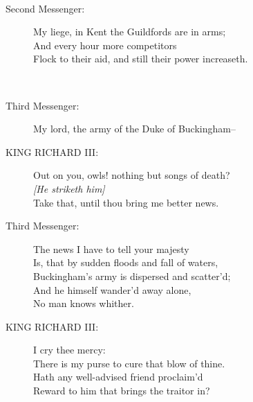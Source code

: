 \documentclass{article}
\begin{document}
\\
\begin{description}
\item[Second Messenger:] 
\hspace{1pt}My liege, in Kent the Guildfords are in arms;\\
\hspace{1pt}And every hour more competitors\\
\hspace{1pt}Flock to their aid, and still their power increaseth.\\
\end{description}
\\
\begin{description}
\item[Third Messenger:] 
\hspace{1pt}My lord, the army of the Duke of Buckingham--\\
\end{description}
\begin{description}
\item[KING RICHARD III:] 
\hspace{1pt}Out on you, owls! nothing but songs of death?\\
{\it [He striketh him]}\\
\hspace{1pt}Take that, until thou bring me better news.\\
\end{description}
\begin{description}
\item[Third Messenger:] 
\hspace{1pt}The news I have to tell your majesty\\
\hspace{1pt}Is, that by sudden floods and fall of waters,\\
\hspace{1pt}Buckingham's army is dispersed and scatter'd;\\
\hspace{1pt}And he himself wander'd away alone,\\
\hspace{1pt}No man knows whither.\\
\end{description}
\begin{description}
\item[KING RICHARD III:] 
\hspace{1pt}I cry thee mercy:\\
\hspace{1pt}There is my purse to cure that blow of thine.\\
\hspace{1pt}Hath any well-advised friend proclaim'd\\
\hspace{1pt}Reward to him that brings the traitor in?\\
\end{description}
\end{document}
